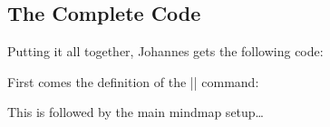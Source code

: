 \subsection{The Complete Code}

Putting it all together, Johannes gets the following code:

First comes the definition of the |\lecture| command:

\begin{codeexample}
\def\lecture#1#2#3#4#5#6{
  \node [annotation, #3, scale=0.65, text width=4cm, inner sep=2mm, fill=white] at (#4) {
    Lecture #1: \textcolor{orange}{\textbf{#2}}
    \list{--}{\topsep=2pt\itemsep=0pt\parsep=0pt
              \parskip=0pt\labelwidth=8pt\leftmargin=8pt
              \itemindent=0pt\labelsep=2pt}
    #5
    \endlist
  };
  \node [anchor=base west] at (cal-#6.base east) {\textcolor{orange}{\textbf{#2}}};
}
\end{codeexample}

This is followed by the main mindmap setup\dots

